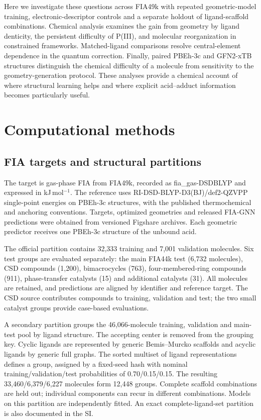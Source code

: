 Here we investigate these questions across FIA49k with repeated geometric-model training, electronic-descriptor controls and a separate holdout of ligand-scaffold combinations. Chemical analysis examines the gain from geometry by ligand denticity, the persistent difficulty of P(III), and molecular reorganization in constrained frameworks. Matched-ligand comparisons resolve central-element dependence in the quantum correction. Finally, paired PBEh-3c and GFN2-xTB structures distinguish the chemical difficulty of a molecule from sensitivity to the geometry-generation protocol. These analyses provide a chemical account of where structural learning helps and where explicit acid--adduct information becomes particularly useful.

\section{Computational methods}

\subsection{FIA targets and structural partitions}

The target is gas-phase FIA from FIA49k, recorded as fia\_\allowbreak{}gas-DSDBLYP and expressed in kJ\,mol$^{-1}$. The reference uses RI-DSD-BLYP-D3(BJ)/def2-QZVPP single-point energies on PBEh-3c structures, with the published thermochemical and anchoring conventions. \cite{sigmund2024fia,fia49ktargets} Targets, optimized geometries and released FIA-GNN predictions were obtained from versioned Figshare archives. \cite{fia49ktargets,fia49kgeometries,fia49kpredictions} Each geometric predictor receives one PBEh-3c structure of the unbound acid.

The official partition contains 32,333 training and 7,001 validation molecules. Six test groups are evaluated separately: the main FIA44k test (6,732 molecules), CSD compounds (1,200), bimacrocycles (763), four-membered-ring compounds (911), phase-transfer catalysts (15) and additional catalysts (31). All molecules are retained, and predictions are aligned by identifier and reference target. The CSD source contributes compounds to training, validation and test; the two small catalyst groups provide case-based evaluations.

A secondary partition groups the 46,066-molecule training, validation and main-test pool by ligand structure. The accepting center is removed from the grouping key. Cyclic ligands are represented by generic Bemis--Murcko scaffolds and acyclic ligands by generic full graphs. The sorted multiset of ligand representations defines a group, assigned by a fixed-seed hash with nominal training/validation/test probabilities of 0.70/0.15/0.15. The resulting 33,460/6,379/6,227 molecules form 12,448 groups. Complete scaffold combinations are held out; individual components can recur in different combinations. Models on this partition are independently fitted. An exact complete-ligand-set partition is also documented in the SI.

